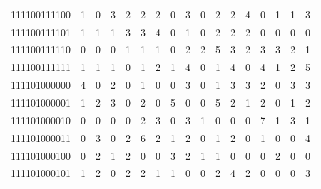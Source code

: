 \documentclass[10pt,a4paper]{article}
\begin{document}
\begin{longtable}{ |c|c|c|c|c|c|c|c|c|c|c|c|c|c|c|c|c| }
    111100111100              & 1                            & 0                                & 3                            & 2                              & 2   & 2   & 0   & 3   & 0   & 2   & 2   & 4   & 0   & 1   & 1   & 3   \\
    111100111101              & 1                            & 1                                & 1                            & 3                              & 3   & 4   & 0   & 1   & 0   & 2   & 2   & 2   & 0   & 0   & 0   & 0   \\
    111100111110              & 0                            & 0                                & 0                            & 1                              & 1   & 1   & 0   & 2   & 2   & 5   & 3   & 2   & 3   & 3   & 2   & 1   \\
    111100111111              & 1                            & 1                                & 1                            & 0                              & 1   & 2   & 1   & 4   & 0   & 1   & 4   & 0   & 4   & 1   & 2   & 5   \\
    111101000000              & 4                            & 0                                & 2                            & 0                              & 1   & 0   & 0   & 3   & 0   & 1   & 3   & 3   & 2   & 0   & 3   & 3   \\
    111101000001              & 1                            & 2                                & 3                            & 0                              & 2   & 0   & 5   & 0   & 0   & 5   & 2   & 1   & 2   & 0   & 1   & 2   \\
    111101000010              & 0                            & 0                                & 0                            & 0                              & 2   & 3   & 0   & 3   & 1   & 0   & 0   & 0   & 7   & 1   & 3   & 1   \\
    111101000011              & 0                            & 3                                & 0                            & 2                              & 6   & 2   & 1   & 2   & 0   & 1   & 2   & 0   & 1   & 0   & 0   & 4   \\
    111101000100              & 0                            & 2                                & 1                            & 2                              & 0   & 0   & 3   & 2   & 1   & 1   & 0   & 0   & 0   & 2   & 0   & 0   \\
    111101000101              & 1                            & 2                                & 0                            & 2                              & 2   & 1   & 1   & 0   & 0   & 2   & 4   & 2   & 0   & 0   & 0   & 3   \\

\end{longtable}
\end{document}

